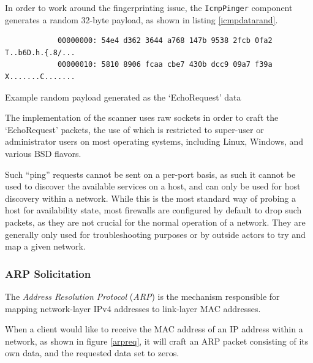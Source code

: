 \documentclass[a4paper,12pt]{article}
\begin{document}
	In order to work around the fingerprinting issue, the \texttt{IcmpPinger} component generates a random 32-byte payload, as shown in listing \ref{icmpdatarand}.
	
	\begin{listing}[H]
		\begin{verbatim}
			00000000: 54e4 d362 3644 a768 147b 9538 2fcb 0fa2  T..b6D.h.{.8/...
			00000010: 5810 8906 fcaa cbe7 430b dcc9 09a7 f39a  X.......C.......
		\end{verbatim}
		\caption{Example random payload generated as the `EchoRequest' data}
		\label{icmpdatarand}
	\end{listing}

	The implementation of the scanner uses raw sockets in order to craft the `EchoRequest' packets, the use of which is restricted to super-user or administrator users on most operating systems, including Linux, Windows, and various BSD flavors.

	Such ``ping'' requests cannot be sent on a per-port basis, as such it cannot be used to discover the available services on a host, and can only be used for host discovery within a network. While this is the most standard way of probing a host for availability state, most firewalls are configured by default to drop such packets, as they are not crucial for the normal operation of a network. They are generally only used for troubleshooting purposes or by outside actors to try and map a given network.

\subsubsection{ARP Solicitation} \label{arpping}
 

	The \textit{Address Resolution Protocol} (\textit{ARP}) is the mechanism responsible for mapping network-layer IPv4 addresses to link-layer MAC addresses.
	
	When a client would like to receive the MAC address of an IP address within a network, as shown in figure \ref{arpreq}, it will craft an ARP packet consisting of its own data, and the requested data set to zeros.
\end{document}
